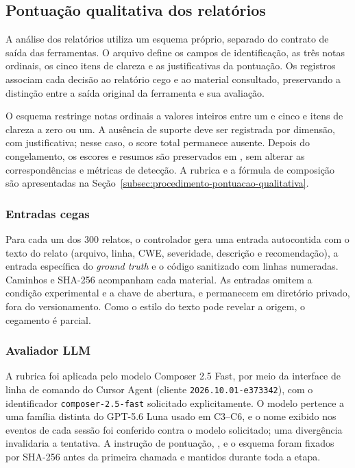 \subsection{Pontuação qualitativa dos relatórios}\label{subsec:registro-pontuacao-qualitativa}

A análise dos relatórios utiliza um esquema próprio, separado do contrato de
saída das ferramentas. O arquivo 
define os campos de identificação, as três notas ordinais, os cinco itens de
clareza e as justificativas da pontuação. Os registros associam cada decisão ao
relatório cego e ao material consultado, preservando a distinção entre a saída
original da ferramenta e sua avaliação.

O esquema restringe notas ordinais a valores inteiros entre um e cinco e itens
de clareza a zero ou um. A ausência de suporte deve ser registrada por dimensão,
com justificativa; nesse caso, o score total permanece ausente. Depois do
congelamento, os escores e resumos são preservados em
, sem alterar as correspondências e
métricas de detecção. A rubrica e a fórmula de composição são apresentadas na
Seção~\ref{subsec:procedimento-pontuacao-qualitativa}.

\subsubsection{Entradas cegas}

Para cada um dos 300 relatos, o controlador gera uma entrada autocontida com o
texto do relato (arquivo, linha, CWE, severidade, descrição e recomendação), a
entrada específica do \textit{ground truth} e o código sanitizado com linhas
numeradas.
Caminhos e SHA-256 acompanham cada material. As entradas omitem a condição
experimental e a chave de abertura, e permanecem em diretório privado, fora do
versionamento. Como o estilo do texto pode revelar a origem, o cegamento é
parcial.

\subsubsection{Avaliador LLM}

A rubrica foi aplicada pelo modelo Composer 2.5 Fast, por meio da interface de
linha de comando do Cursor Agent (cliente \texttt{2026.10.01-e373342}), com o
identificador \texttt{composer-2.5-fast} solicitado explicitamente. O modelo
pertence a uma família distinta do GPT-5.6 Luna usado em C3--C6, e o nome
exibido nos eventos de cada sessão foi conferido contra o modelo solicitado;
uma divergência invalidaria a tentativa. A instrução de pontuação,
, e o esquema foram
fixados por SHA-256 antes da primeira chamada e mantidos durante toda a etapa.

